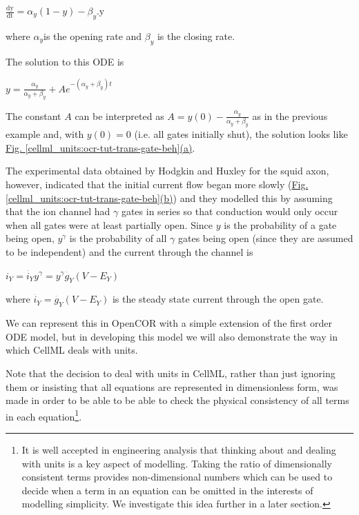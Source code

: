 \documentclass[a4paper,10pt,english]{sphinxmanual}
\begin{document}
\(\frac{\text{dy}}{\text{dt}} = \alpha_{y}\left( 1 - y \right) - \beta_{y}\text{.y}\)

where \(\alpha_{y}\)is the opening rate and \(\beta_{y}\) is
the closing rate.

The solution to this ODE is

\(y = \frac{\alpha_{y}}{\alpha_{y} + \beta_{y}} + Ae^{- \left( \alpha_{y} + \beta_{y} \right)t}\)

The constant \(A\) can be interpreted as
\(A = y\left( 0 \right) - \frac{\alpha_{y}}{\alpha_{y} + \beta_{y}}\)
as in the previous example and, with \(y\left( 0 \right) = 0\) (i.e.
all gates initially shut), the solution looks like \hyperref[cellml_units:ocr-tut-trans-gate-beh]{Fig. \ref{cellml_units:ocr-tut-trans-gate-beh}(a)}.

The experimental data obtained by Hodgkin and Huxley for the squid axon,
however, indicated that the initial current flow began more slowly
(\hyperref[cellml_units:ocr-tut-trans-gate-beh]{Fig. \ref{cellml_units:ocr-tut-trans-gate-beh}(b)}) and they modelled this by assuming that the ion channel had
\(\gamma\) gates in series so that conduction would only occur when
all gates were at least partially open. Since \(y\) is the
probability of a gate being open, \(y^{\gamma}\) is the probability
of all \(\gamma\) gates being open (since they are assumed to be
independent) and the current through the channel is

\(i_{Y} = {\overset{\overline{}}{i}}_{Y}y^{\gamma} = y^{\gamma}{\overset{\overline{}}{g}}_{Y}\left( V - E_{Y} \right)\)

where
\({\overset{\overline{}}{i}}_{Y}{= \overset{\overline{}}{g}}_{Y}\left( V - E_{Y} \right)\)
is the steady state current through the open gate.

We can represent this in OpenCOR with a simple extension of the first
order ODE model, but in developing this model we will also demonstrate
the way in which CellML deals with units.

Note that the decision to deal with units in CellML, rather than just
ignoring them or insisting that all equations are represented in
dimensionless form, was made in order to be able to be able to check the
physical consistency of all terms in each equation\footnote[5]{
It is well accepted in engineering analysis that thinking about and
dealing with units is a key aspect of modelling. Taking the ratio of
dimensionally consistent terms provides non-dimensional numbers which
can be used to decide when a term in an equation can be omitted in
the interests of modelling simplicity. We investigate this idea
further in a later section.
}.
\end{document}
